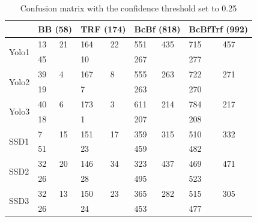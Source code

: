 \begin{table}[h!]
\centering
\begin{tabular}{l|ll|ll|ll|ll}
                       & \multicolumn{2}{l|}{BB (58)} & \multicolumn{2}{l|}{TRF (174)} & \multicolumn{2}{l|}{BcBf (818)} & \multicolumn{2}{l}{BcBfTrf (992)} \\ \hline
\multirow{2}{*}{Yolo1} & 13            & 21           & 164            & 22            & 551            & 435            & 715              & 457             \\
                       & 45            &              & 10             &               & 267            &                & 277              &                 \\ \hline

\multirow{2}{*}{Yolo2} & 39            & 4            & 167            & 8             & 555            & 263            & 722              & 271             \\
                       & 19            &              & 7              &               & 263            &                & 270              &                 \\ \hline
\multirow{2}{*}{Yolo3} & 40            & 6            & 173            & 3             & 611            & 214            & 784              & 217             \\
                       & 18            &              & 1              &               & 207            &                & 208              &                 \\ \hline
\multirow{2}{*}{SSD1}  & 7             & 15           & 151            & 17            & 359            & 315            & 510              & 332             \\
                       & 51            &              & 23             &               & 459            &                & 482              &                 \\ \hline
\multirow{2}{*}{SSD2}  & 32            & 20           & 146            & 34            & 323            & 437            & 469              & 471             \\
                       & 26            &              & 28             &               & 495            &                & 523              &                 \\ \hline

\multirow{2}{*}{SSD3}  & 32            & 13           & 150            & 23            & 365            & 282            & 515              & 305             \\
                       & 26            &              & 24             &               & 453            &                & 477              &                
\end{tabular}
\caption{Confusion matrix with the confidence threshold set to 0.25}
\label{tab:conf_025}
\end{table}


